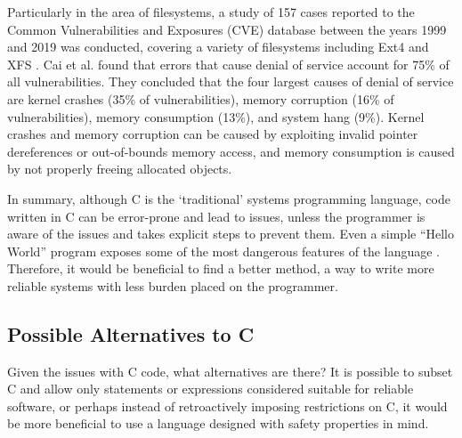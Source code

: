 Particularly in the area of filesystems, a study of 157 cases reported to the Common Vulnerabilities and Exposures (CVE) database between the years 1999 and 2019 was conducted, covering a variety of filesystems including Ext4 and XFS \cite{cai2019}.
Cai et al. found that errors that cause denial of service account for 75\% of all vulnerabilities.
They concluded that the four largest causes of denial of service are kernel crashes (35\% of vulnerabilities), memory corruption (16\% of vulnerabilities), memory consumption (13\%), and system hang (9\%).
Kernel crashes and memory corruption can be caused by exploiting invalid pointer dereferences or out-of-bounds memory access, and memory consumption is caused by not properly freeing allocated objects.

In summary, although C is the `traditional' systems programming language, code written in C can be error-prone and lead to issues, unless the programmer is aware of the issues and takes explicit steps to prevent them.
Even a simple ``Hello World'' program exposes some of the most dangerous features of the language \cite{milewski}.
Therefore, it would be beneficial to find a better method, a way to write more reliable systems with less burden placed on the programmer.

\subsection{Possible Alternatives to C}
Given the issues with C code, what alternatives are there?
It is possible to subset C and allow only statements or expressions considered suitable for reliable software, or perhaps instead of retroactively imposing restrictions on C, it would be more beneficial to use a language designed with safety properties in mind.

